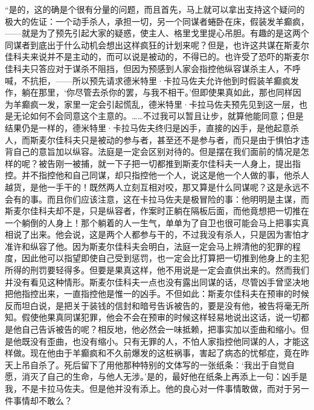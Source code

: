 \par “是的，这的确是个很有分量的问题，而且首先，马上就可以拿出支持这个疑问的极大的佐证：一个动手杀人，承担一切，另一个同谋者蜷卧在床，假装发羊癫疯，——就是为了预先引起大家的疑惑，使主人、格里戈里提心吊胆。有趣的是这两个同谋者到底出于什么动机会想出这样疯狂的计划来呢？但是，也许这共谋在斯麦尔佳科夫来说并不是主动的，而可以说是被动的，不得已的。也许受了恐吓的斯麦尔佳科夫只答应对于谋杀不阻挡，但因为预感到人家会指控他纵容谋杀主人，不呼喊，不抗拒，——所以预先请求德米特里·卡拉马佐夫允许他到时假装羊癫疯发作，躺在那里，‘你尽管去杀你的罢，与我不相干。’但即使果真如此，那也同样因为羊癫疯一发，家里一定会引起慌乱，德米特里·卡拉马佐夫预先见到这一层，也是无论如何不会同意这个主意的。……不过我可以暂且让步，就算他能同意；但是结果仍是一样的，德米特里·卡拉马佐夫终归是凶手，直接的凶手，是他起意杀人，而斯麦尔佳科夫只是被动的参与者，甚至还不是参与者，而只是由于惧怕才违背自己的意旨加以纵容。法庭是一定会区别对待的。但是摆在我们面前的情况是怎样的呢？被告刚一被捕，就一下子把一切都推到斯麦尔佳科夫一人身上，提出指控。并不指控他和自己同谋，却只指控他一个人，说这是他一个人做的事，他杀人越货，是他一手干的！既然两人立刻互相对咬，那又算是什么同谋呢？这是永远不会有的事。而且你们应该注意，这在卡拉马佐夫是极冒险的事：他明明是主谋，而斯麦尔佳科夫却不是，只是纵容者，作案时正躺在隔板后面，而他竟想把一切推在一个躺倒的人身上！那个躺着的人一生气，单单为了自卫也很可能会马上把事实真相说了出来。他会说，这是两个人都参与干的，不过我没有杀人，只是因为害怕才准许和纵容了他。因为斯麦尔佳科夫会明白，法庭一定会马上辨清他的犯罪的程度，因此他可以指望即使自己受到惩罚，也一定会比打算把一切推到他身上的主犯所得的刑罚要轻得多。但要是果真这样，他不用说是一定会直供出来的。然而我们并没有看见这种情形。斯麦尔佳科夫一点也没有露出同谋的话，尽管凶手曾坚决地把他指控出来，一直指控他是惟一的凶手。不但如此：斯麦尔佳科夫在预审的时候反而坦白说，是把关于装钱的信封和暗号告诉被告的，要是没有他，被告将毫无所知。假使他果真同谋犯罪，他会不会在预审的时候这样轻易地说出这话，说一切都是他自己告诉被告的呢？相反地，他必然会一味抵赖，把事实加以歪曲和缩小。但是他既没有歪曲，也没有缩小。只有无罪的人，不怕人家指控他同谋的人，才能这样做。现在他由于羊癫疯和不久前爆发的这桩祸事，害起了病态的忧郁症，竟在昨天上吊自杀了。死后留下了用他那种特别的文体写的一张纸条：‘我出于自觉自愿，消灭了自己的生命，与他人无涉。’是的，最好他在纸条上再添上一句：凶手是我，不是卡拉马佐夫。但是他并没有添上。他的良心对一件事情敢做，而对于另一件事情却不敢么？
